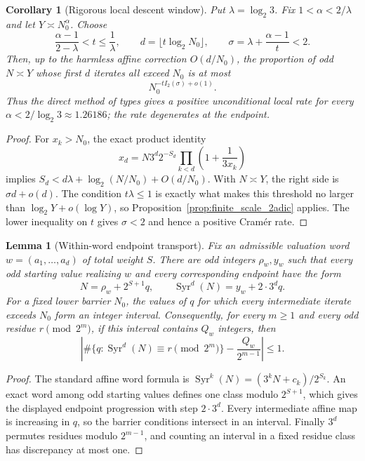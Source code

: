 \documentclass[12pt,a4paper]{article}
\newtheorem{lemma}[theorem]{Lemma}
\newtheorem{corollary}[theorem]{Corollary}
\begin{document}
\begin{corollary}[Rigorous local descent window]
\label{cor:local_descent}
Put $\lambda=\log_2 3$.  Fix
$1<\alpha<2/\lambda$ and let $Y\asymp N_0^\alpha$.  Choose
\[
 \frac{\alpha-1}{2-\lambda}<t\le\frac1\lambda,
 \qquad d=\lfloor t\log_2N_0\rfloor,
 \qquad \sigma=\lambda+\frac{\alpha-1}{t}<2.
\]
Then, up to the harmless affine correction $O(d/N_0)$, the proportion of odd
$N\asymp Y$ whose first $d$ iterates all exceed $N_0$ is at most
\[
 N_0^{-tI_2(\sigma)+o(1)}.
\]
Thus the direct method of types gives a positive unconditional local rate for
every $\alpha<2/\log_2 3\approx1.26186$; the rate degenerates at the endpoint.
\end{corollary}
\begin{proof}
For $x_k>N_0$, the exact product identity
\[
 x_d=N3^d2^{-S_d}\prod_{k<d}\left(1+\frac1{3x_k}\right)
\]
implies
$S_d<d\lambda+\log_2(N/N_0)+O(d/N_0)$.  With $N\asymp Y$, the right side is
$\sigma d+o(d)$.  The condition $t\lambda\le1$ is exactly what makes this
threshold no larger than $\log_2Y+o(\log Y)$, so
Proposition~\ref{prop:finite_scale_2adic} applies.  The lower inequality on
$t$ gives $\sigma<2$ and hence a positive Cram\'er rate.
\end{proof}

\begin{lemma}[Within-word endpoint transport]
\label{lem:within_word_transport}
Fix an admissible valuation word $w=(a_1,\ldots,a_d)$ of total weight $S$.
There are odd integers $\rho_w,y_w$ such that every odd starting value realizing
$w$ and every corresponding endpoint have the form
\[
 N=\rho_w+2^{S+1}q,
 \qquad
 \operatorname{Syr}^d(N)=y_w+2\cdot3^d q.
\]
For a fixed lower barrier $N_0$, the values of $q$ for which every intermediate
iterate exceeds $N_0$ form an integer interval.  Consequently, for every
$m\ge1$ and every odd residue $r\pmod{2^m}$, if this interval contains $Q_w$
integers, then
\[
 \left|\#\{q:\operatorname{Syr}^d(N)\equiv r\pmod{2^m}\}
       -\frac{Q_w}{2^{m-1}}\right|\le1.
\]
\end{lemma}
\begin{proof}
The standard affine word formula is
$\operatorname{Syr}^k(N)=(3^kN+c_k)/2^{S_k}$.  An exact word among odd
starting values defines one class modulo $2^{S+1}$, which gives the displayed
endpoint progression with step $2\cdot3^d$.  Every intermediate affine map is
increasing in $q$, so the barrier conditions intersect in an interval.  Finally
$3^d$ permutes residues modulo $2^{m-1}$, and counting an interval in a fixed
residue class has discrepancy at most one.
\end{proof}
\end{document}
